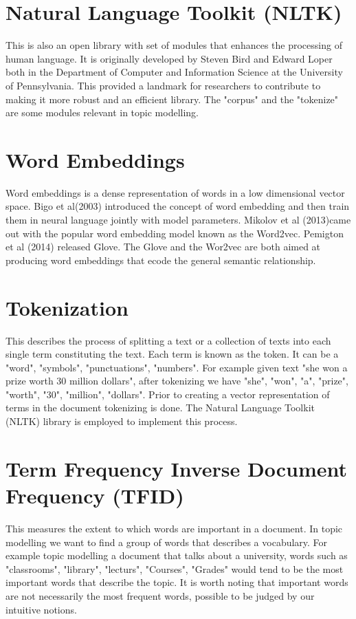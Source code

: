 \section{Natural  Language Toolkit (NLTK)}
This is also an open library with set of modules that enhances the processing of human language. It is originally developed by Steven Bird and Edward Loper both in  the Department of Computer and Information Science at the University of Pennsylvania. This provided a landmark for researchers to contribute to making it more robust and an efficient library. The "corpus" and the "tokenize" are some modules relevant in topic modelling.
\section{Word Embeddings}
Word embeddings is a dense representation of words in a low dimensional vector space. Bigo et al(2003) introduced the  concept of word embedding and then train them in neural language jointly with model parameters. Mikolov et al (2013)came out with the popular word embedding model known as the Word2vec. 
Pemigton et al (2014) released Glove. The Glove and the Wor2vec are both aimed at producing word embeddings that ecode the general semantic relationship.
\section{Tokenization}
This describes the process of splitting  a text or a collection of texts  into each single term constituting the text. Each term is known as the token. It can be a "word", "symbols", "punctuations", "numbers". For example given text "she won a prize worth 30 million dollars", after tokenizing we have "she", "won", "a", "prize", "worth", "30", "million", "dollars". Prior to creating a vector representation of terms in the document tokenizing is done. The Natural Language Toolkit (NLTK) library is employed to implement this process. 
\section{Term Frequency Inverse Document Frequency (TFID)}
This measures the extent to which words are important in a document. In topic modelling we want to find a group of words that describes a vocabulary. For example topic modelling a document that talks about a university, words such as "classrooms", "library", "lecturs", "Courses", "Grades" would tend to be the most important words that describe the topic. It is worth noting that important words are not necessarily the most frequent words, possible to be judged by our intuitive notions. 

